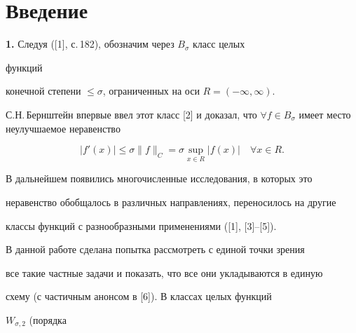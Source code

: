 

\pagestyle{plain} %


 




\maketitle 


\label{begin} 


 


\section{Введение} 


 


{\bf 1.} Следуя ([1], с.\,182), обозначим через $B_\sigma$ класс целых 


функций 


конечной степени $\le\sigma$, ограниченных на оси $R=(-\infty,\infty)$. 


С.Н.\,Бернштейн впервые ввел этот класс [2] и доказал, что $\forall f\in 


B_\sigma$ имеет место неулучшаемое неравенство 


$$ 


|f'(x)|\le\sigma\|f\|_C=\sigma\sup_{x\in R}|f(x)| 


\quad \forall x\in R. 


$$ 


 


В дальнейшем появились многочисленные исследования, в которых это 


неравенство обобщалось в различных направлениях, переносилось на другие 


классы функций с разнообразными применениями ([1], [3]--[5]). 


 


В данной работе сделана попытка рассмотреть с единой точки зрения 


все такие частные задачи и показать, что все они укладываются в единую 


схему (с частичным анонсом в [6]). В классах целых функций 


$W_{\sigma,2}$ (порядка 


